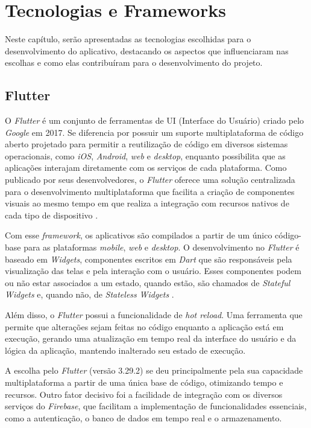 \chapter{Tecnologias e Frameworks}\label{tecnologias}

Neste capítulo, serão apresentadas as tecnologias escolhidas para o 
desenvolvimento do aplicativo, destacando os aspectos que influenciaram nas 
escolhas e como elas contribuíram para o desenvolvimento do projeto.

\section{Flutter}

O \textit{Flutter} é um conjunto de ferramentas de UI (Interface do Usuário) criado 
pelo \textit{Google} em 2017. Se diferencia por possuir um suporte multiplataforma de código aberto 
projetado para permitir a reutilização de código em diversos sistemas operacionais, como \textit{iOS}, 
\textit{Android}, \textit{web} e \textit{desktop}, enquanto possibilita que as aplicações interajam 
diretamente com os serviços de cada plataforma. Como publicado por seus desenvolvedores, 
o \textit{Flutter} oferece 
uma solução centralizada para o desenvolvimento multiplataforma que facilita a criação de 
componentes visuais ao mesmo tempo em que realiza a integração com recursos nativos de cada tipo 
de dispositivo \cite{flutterDocs2025}.

Com esse \textit{framework}, os aplicativos são compilados a partir de um único código-base para as 
plataformas \textit{mobile}, \textit{web} e \textit{desktop}. O desenvolvimento no \textit{Flutter} é baseado em \textit{Widgets}, 
componentes escritos em \textit{Dart} que são responsáveis pela visualização das telas e pela interação 
com o usuário.
Esses componentes podem ou não estar associados a um estado, quando estão, são chamados de \textit{Stateful} 
\textit{Widgets} e, quando não, de \textit{Stateless} \textit{Widgets} \cite{flutterDocs2025}.

Além disso, o \textit{Flutter} possui a funcionalidade de \textit{hot reload}. 
Uma ferramenta que permite que alterações sejam feitas no código 
enquanto a aplicação está em execução, gerando uma 
atualização em tempo real da interface do usuário e da lógica da aplicação, 
mantendo inalterado seu estado de execução.

A escolha pelo \textit{Flutter} (versão 3.29.2) se deu principalmente pela sua capacidade multiplataforma a partir de 
uma única base de código, otimizando tempo e recursos. Outro fator decisivo foi a 
facilidade de integração com os diversos serviços do \textit{Firebase}, 
que facilitam a implementação de funcionalidades essenciais,  
como a autenticação, o banco de dados em tempo real e o armazenamento.


